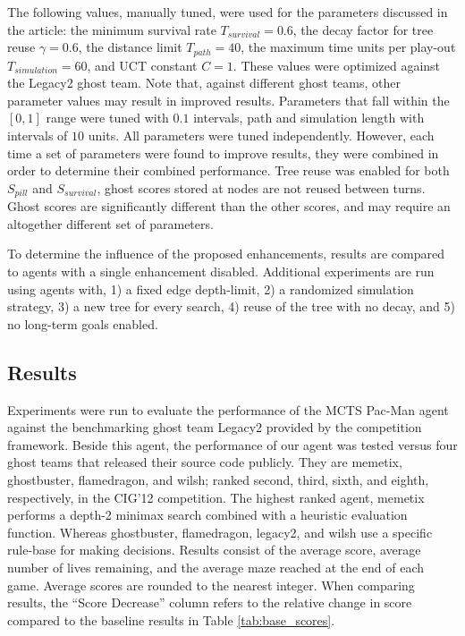 \documentclass[journal]{IEEEtran}
\begin{document}
The following values, manually tuned, were used for the parameters discussed in the article: the minimum survival rate $T_{survival} = 0.6$, the decay factor for tree reuse $\gamma = 0.6$, the distance limit $T_{path} = 40$, the maximum time units per play-out $T_{simulation} = 60$, and UCT constant $C = 1$. These values were optimized against the {\sc Legacy2} ghost team. Note that, against different ghost teams, other parameter values may result in improved results. Parameters that fall within the $[0, 1]$ range were tuned with $0.1$ intervals, path and simulation length with intervals of $10$ units. All parameters were tuned independently. However, each time a set of parameters were found to improve results, they were combined in order to determine their combined performance. Tree reuse was enabled for both $S_{pill}$ and $S_{survival}$, ghost scores stored at nodes are not reused between turns. Ghost scores are significantly different than the other scores, and may require an altogether different set of parameters.

To determine the influence of the proposed enhancements, results are compared to agents with a single enhancement disabled. Additional experiments are run using agents with, 1) a fixed edge depth-limit, 2) a randomized simulation strategy, 3) a new tree for every search, 4) reuse of the tree with no decay, and 5) no long-term goals enabled.

\subsection{Results}
Experiments were run to evaluate the performance of the {\sc MCTS Pac-Man} agent against the benchmarking ghost team {\sc Legacy2} provided by the competition framework. Beside this agent, the performance of our agent was tested versus four ghost teams that released their source code publicly. They are {\sc memetix}, {\sc ghostbuster}, {\sc flamedragon}, and {\sc wilsh}; ranked second, third, sixth, and eighth, respectively, in the CIG'12 competition. The highest ranked agent, {\sc memetix} performs a depth-2 minimax search combined with a heuristic evaluation function. Whereas {\sc ghostbuster}, {\sc flamedragon}, {\sc legacy2}, and {\sc wilsh} use a specific rule-base for making decisions.
Results consist of the average score, average number of lives remaining, and the average maze reached at the end of each game. Average scores are rounded to the nearest integer. When comparing results, the ``Score Decrease'' column refers to the relative change in score compared to the baseline results in Table \ref{tab:base_scores}.
\end{document}
